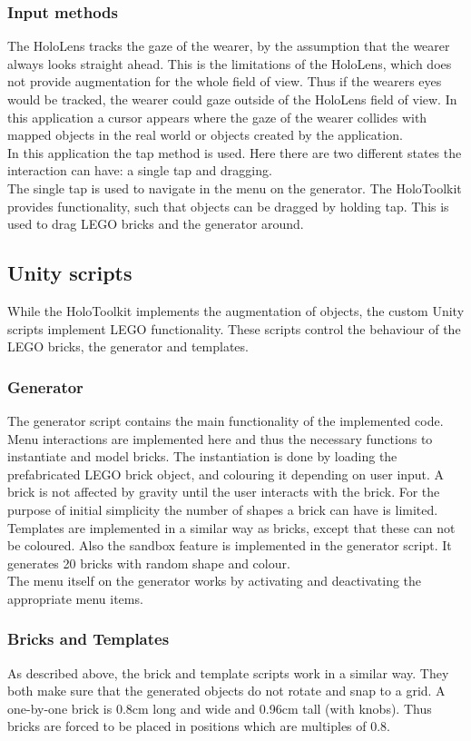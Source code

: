\subsubsection{Input methods}
The HoloLens tracks the gaze of the wearer, by the assumption that the wearer always looks straight ahead. This is the limitations of the HoloLens, which does not provide augmentation for the whole field of view. Thus if the wearers eyes would be tracked, the wearer could gaze outside of the HoloLens field of view. In this application a cursor appears where the gaze of the wearer collides with mapped objects in the real world or objects created by the application.\\ 
In this application the tap method is used. Here there are two different states the interaction can have: a single tap and dragging. \\
The single tap is used to navigate in the menu on the generator. The HoloToolkit provides functionality, such that objects can be dragged by holding tap. This is used to drag LEGO bricks and the generator around.

\subsection{Unity scripts}
While the HoloToolkit implements the augmentation of objects, the custom Unity scripts implement LEGO functionality. These scripts control the behaviour of the LEGO bricks, the generator and templates. 

\subsubsection{Generator}
The generator script contains the main functionality of the implemented code. Menu interactions are implemented here and thus the necessary functions to instantiate and model bricks. The instantiation is done by loading the prefabricated LEGO brick object, and colouring it depending on user input. A brick is not affected by gravity until the user interacts with the brick. For the purpose of initial simplicity the number of shapes a brick can have is limited. \\
Templates are implemented in a similar way as bricks, except that these can not be coloured. Also the sandbox feature is implemented in the generator script. It generates 20 bricks with random shape and colour. \\
The menu itself on the generator works by activating and deactivating the appropriate menu items.

\subsubsection{Bricks and Templates}
As described above, the brick and template scripts work in a similar way. They both make sure that the generated objects do not rotate and snap to a grid. A one-by-one brick is 0.8cm long and wide and 0.96cm tall (with knobs). Thus bricks are forced to be placed in positions which are multiples of 0.8.
